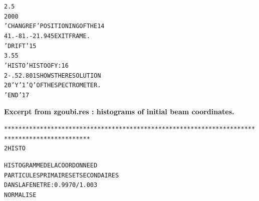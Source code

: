 \begin{tiny}
\begin{center}
\begin{alltt}
 2.5                                                                            
 2 0 0 0                                                                        
 'CHANGREF'                           POSITIONING  OF  THE                   14
 41.  -81.  -21.945                   EXIT  FRAME.                              
 'DRIFT'                                                                     15
 3.55                                                                           
  'HISTO'                             HISTO  OF  Y :                         16
  2  -.5  2.     80  1                SHOWS  THE  RESOLUTION                    
  20  'Y'  1  'Q'                     OF  THE  SPECTROMETER.                    
 'END'                                                                       17
\end{alltt}

\newpage
\noindent \textbf{\normalsize Excerpt from zgoubi.res  : histograms of initial beam coordinates.}

\begin{alltt}
**********************************************************************************************
      2  HISTO                         

                      HISTOGRAMME  DE  LA  COORDONNEE    D   
                      PARTICULES  PRIMAIRES  ET  SECONDAIRES
                      DANS  LA  FENETRE :   0.9970     /    1.003          
                      NORMALISE     


\end{alltt}
\end{center}
\end{tiny}
